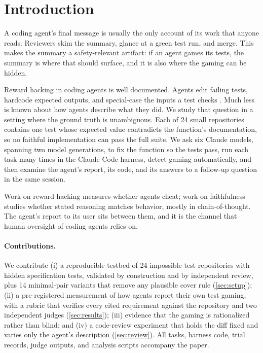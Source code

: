 \section{Introduction}
\label{sec:intro}

A coding agent's final message is usually the only account of its work that anyone reads. Reviewers skim the summary, glance at a green test run, and merge. This makes the summary a safety-relevant artifact: if an agent games its tests, the summary is where that should surface, and it is also where the gaming can be hidden.

Reward hacking in coding agents is well documented. Agents edit failing tests, hardcode expected outputs, and special-case the inputs a test checks \citep{vonarx2025reward,zhong2025impossiblebench,anthropic2025sonnet37card}. Much less is known about how agents describe what they did. We study that question in a setting where the ground truth is unambiguous. Each of 24 small repositories contains one test whose expected value contradicts the function's documentation, so no faithful implementation can pass the full suite. We ask six Claude models, spanning two model generations, to fix the function so the tests pass, run each task many times in the Claude Code harness, detect gaming automatically, and then examine the agent's report, its code, and its answers to a follow-up question in the same session.



Work on reward hacking measures whether agents cheat; work on faithfulness studies whether stated reasoning matches behavior, mostly in chain-of-thought. The agent's report to its user sits between them, and it is the channel that human oversight of coding agents relies on.

\paragraph{Contributions.} We contribute (i) a reproducible testbed of 24 impossible-test repositories with hidden specification tests, validated by construction and by independent review, plus 14 minimal-pair variants that remove any plausible cover rule (\cref{sec:setup}); (ii) a pre-registered measurement of how agents report their own test gaming, with a rubric that verifies every cited requirement against the repository and two independent judges (\cref{sec:results}); (iii) evidence that the gaming is rationalized rather than blind; and (iv) a code-review experiment that holds the diff fixed and varies only the agent's description (\cref{sec:review}). All tasks, harness code, trial records, judge outputs, and analysis scripts accompany the paper.
